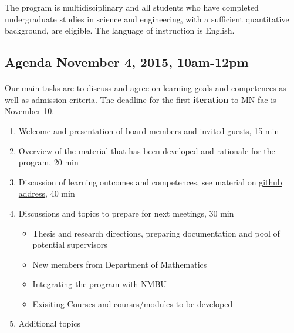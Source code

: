 \documentclass[%
oneside,                 %
final,                   %
10pt]{article}
\begin{document}
\noindent
The program is multidisciplinary and all students who have completed
undergraduate studies in science and engineering, with a sufficient
quantitative background, are eligible.  The language of instruction is
English.




\subsection*{Agenda November 4, 2015, 10am-12pm}

\paragraph{}
Our main tasks are to discuss and agree on learning goals and competences as well as admission criteria. The deadline for the first \textbf{iteration} to MN-fac is November 10. 

\begin{enumerate}
\item Welcome and presentation of board members and invited guests, 15 min

\item Overview of the material that has been developed and rationale for the program, 20 min

\item Discussion of learning outcomes and competences, see material on \href{{http://mhjensen.github.io/CPMLS/doc/pub/Masterprogram/html/Masterprogram.html}}{github address}, 40 min

\item Discussions and topics to prepare for next meetings, 30 min
\begin{itemize}

  \item Thesis and research directions, preparing documentation and pool of potential supervisors

  \item New members from Department of Mathematics

  \item Integrating the program with NMBU

  \item Exisiting Courses and courses/modules to be developed 

\end{itemize}

\noindent
\item Additional topics
\end{enumerate}
\end{document}
